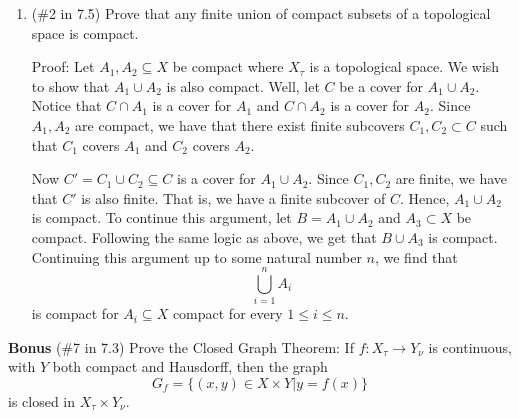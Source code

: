 \documentclass[12pt]{article}
\begin{document}
\begin{enumerate}
\item (\#2 in 7.5) Prove that any finite union of compact subsets of a topological space is compact.
\newline

Proof: Let $A_1, A_2 \subseteq X$ be compact where $X_{\tau}$ is a topological space. We wish to show that $A_1 \cup A_2$ is also compact. Well, let $C$ be a cover for $A_1 \cup A_2$. 
Notice that $C \cap A_1$ is a cover for $A_1$ and $C \cap A_2$ is a cover for $A_2$. Since $A_1, A_2$ are compact, we have that there exist finite subcovers $C_1, C_2 \subset C$ such that $C_1$ covers $A_1$ and $C_2$ covers $A_2$.

Now $C' = C_1 \cup C_2 \subseteq C$ is a cover for $A_1 \cup A_2$. Since $C_1, C_2$ are finite, we have that $C'$ is also finite. That is, we have a finite subcover of $C$. Hence, $A_1 \cup A_2$ is compact. To continue this argument, let $B = A_1 \cup A_2$ and $A_3 \subset X$ be compact. Following the same logic as above, we get that $B \cup A_3$ is compact. Continuing this argument up to some natural number $n$, we find that
\[\bigcup_{i = 1}^n A_i\]
is compact for $A_i \subseteq X$ compact for every $1 \leq i \leq n$.
\newline

\end{enumerate}

\noindent \textbf{Bonus} (\#7 in 7.3) Prove the Closed Graph Theorem: If $f: X_{\tau} \to Y_{\nu}$ is continuous, with $Y$ both compact and Hausdorff, then the graph $$G_f = \{(x,y) \in X\times Y | y=f(x)\}$$ is closed in $X_{\tau}\times Y_{\nu}$.
\end{document}
